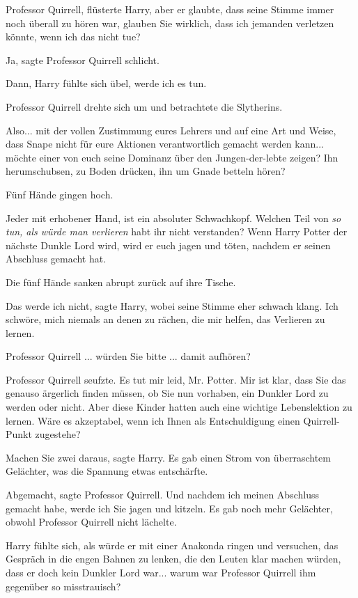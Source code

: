 \glqq{}Professor Quirrell\grqq{}, flüsterte Harry, aber er glaubte, dass seine
Stimme immer noch überall zu hören war, \glqq{}glauben Sie wirklich, dass ich
jemanden verletzen könnte, wenn ich das nicht tue?\grqq{}

\glqq{}Ja\grqq{}, sagte Professor Quirrell schlicht.

\glqq{}Dann\grqq{}, Harry fühlte sich übel, \glqq{}werde ich es tun.\grqq{}

Professor Quirrell drehte sich um und betrachtete die Slytherins.

\glqq{}Also... mit der vollen Zustimmung eures Lehrers und auf eine Art und
Weise, dass Snape nicht für eure Aktionen verantwortlich gemacht werden kann...
möchte einer von euch seine Dominanz über den Jungen-der-lebte zeigen? Ihn
herumschubsen, zu Boden drücken, ihn um Gnade betteln hören?\grqq{}

Fünf Hände gingen hoch.

\glqq{}Jeder mit erhobener Hand, ist ein absoluter Schwachkopf. Welchen Teil von
\emph{\glqq{}so tun, als würde man verlieren\grqq{}} habt ihr nicht verstanden?
Wenn Harry Potter der nächste Dunkle Lord wird, wird er euch jagen und töten,
nachdem er seinen Abschluss gemacht hat.\grqq{}

Die fünf Hände sanken abrupt zurück auf ihre Tische.

\glqq{}Das werde ich nicht\grqq{}, sagte Harry, wobei seine Stimme eher schwach
klang. \glqq{}Ich schwöre, mich niemals an denen zu rächen, die mir helfen, das
Verlieren zu lernen.

Professor Quirrell ... würden Sie bitte ... damit aufhören?\grqq{}

Professor Quirrell seufzte. \glqq{}Es tut mir leid, Mr. Potter. Mir ist klar,
dass Sie das genauso ärgerlich finden müssen, ob Sie nun vorhaben, ein Dunkler
Lord zu werden oder nicht. Aber diese Kinder hatten auch eine wichtige
Lebenslektion zu lernen. Wäre es akzeptabel, wenn ich Ihnen als Entschuldigung
einen Quirrell-Punkt zugestehe?\grqq{}

\glqq{}Machen Sie zwei daraus\grqq{}, sagte Harry. Es gab einen Strom von
überraschtem Gelächter, was die Spannung etwas entschärfte.

\glqq{}Abgemacht\grqq{}, sagte Professor Quirrell. \glqq{}Und nachdem ich meinen
Abschluss gemacht habe, werde ich Sie jagen und kitzeln.\grqq{} Es gab noch mehr
Gelächter, obwohl Professor Quirrell nicht lächelte.

Harry fühlte sich, als würde er mit einer Anakonda ringen und versuchen, das
Gespräch in die engen Bahnen zu lenken, die den Leuten klar machen würden, dass
er doch kein Dunkler Lord war... warum war Professor Quirrell ihm gegenüber so
misstrauisch?

